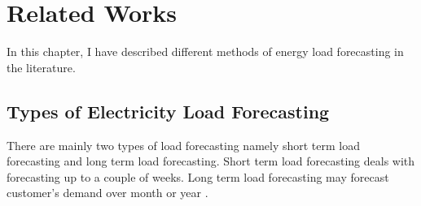 
\chapter{Related Works}


In this chapter, I have described different methods of energy load forecasting in the literature. 

\section{Types of Electricity Load Forecasting}
There are mainly two types of load forecasting namely short term load forecasting and long term load forecasting. Short term load forecasting deals with forecasting up to a couple of weeks. Long term load forecasting may forecast customer's demand over month or year \cite{cho1995customer}.

